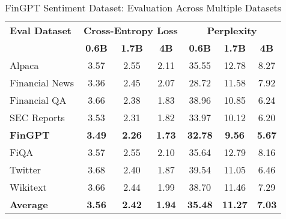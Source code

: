 
\begin{table}[h]
\centering
\caption[FinGPT Sentiment: Evaluation Results]{FinGPT Sentiment Dataset: Evaluation Across Multiple Datasets}
\label{tab:fingpt_results}
\begin{tabular}{l|ccc|ccc}
\hline
\textbf{Eval Dataset} & \multicolumn{3}{c|}{\textbf{Cross-Entropy Loss}} & \multicolumn{3}{c}{\textbf{Perplexity}} \\
\cline{2-4} \cline{5-7}
  & \textbf{0.6B} & \textbf{1.7B} & \textbf{4B} & \textbf{0.6B} & \textbf{1.7B} & \textbf{4B} \\
Alpaca & 3.57 & 2.55 & 2.11 & 35.55 & 12.78 & 8.27 \\
Financial News & 3.36 & 2.45 & 2.07 & 28.72 & 11.58 & 7.92 \\
Financial QA & 3.66 & 2.38 & 1.83 & 38.96 & 10.85 & 6.24 \\
SEC Reports & 3.53 & 2.31 & 1.82 & 33.97 & 10.12 & 6.20 \\
\textbf{FinGPT} & \textbf{3.49} & \textbf{2.26} & \textbf{1.73} & \textbf{32.78} & \textbf{9.56} & \textbf{5.67} \\
FiQA & 3.57 & 2.55 & 2.10 & 35.64 & 12.79 & 8.16 \\
Twitter & 3.68 & 2.40 & 1.87 & 39.54 & 11.05 & 6.46 \\
Wikitext & 3.66 & 2.44 & 1.99 & 38.70 & 11.46 & 7.29 \\
\hline
\textbf{Average} & \textbf{3.56} & \textbf{2.42} & \textbf{1.94} & \textbf{35.48} & \textbf{11.27} & \textbf{7.03} \\
\hline
\end{tabular}
\end{table}
